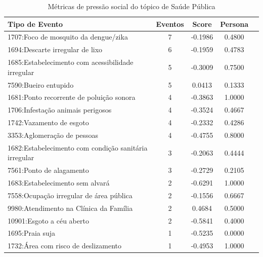 \begin{table}[htbp]
	\centering
	\caption{Métricas de pressão social do tópico de Saúde Pública}
	\label{tab:eventos_populares_public_health}
	\begin{tabular}{|l|c|c|c|c|}
		\hline
		\textbf{Tipo de Evento}                               & \textbf{Eventos} & \textbf{Score} & \textbf{Persona} \\
		\hline
		1707:Foco de mosquito da dengue/zika                  & 7                & -0.1986        & 0.4800           \\
		\hline
		1694:Descarte irregular de lixo                       & 6                & -0.1959        & 0.4783           \\
		\hline
		1685:Estabelecimento com acessibilidade irregular     & 5                & -0.3009        & 0.7500           \\
		\hline
		7590:Bueiro entupido                                  & 5                & 0.0413         & 0.1333           \\
		\hline
		1681:Ponto recorrente de poluição sonora              & 4                & -0.3863        & 1.0000           \\
		\hline
		1706:Infestação animais perigosos                     & 4                & -0.3524        & 0.4667           \\
		\hline
		1742:Vazamento de esgoto                              & 4                & -0.2332        & 0.4286           \\
		\hline
		3353:Aglomeração de pessoas                           & 4                & -0.4755        & 0.8000           \\
		\hline
		1682:Estabelecimento com condição sanitária irregular & 3                & -0.2063        & 0.4444           \\
		\hline
		7561:Ponto de alagamento                              & 3                & -0.2729        & 0.2105           \\
		\hline
		1683:Estabelecimento sem alvará                       & 2                & -0.6291        & 1.0000           \\
		\hline
		7558:Ocupação irregular de área pública               & 2                & -0.1556        & 0.6667           \\
		\hline
		9980:Atendimento na Clínica da Família                & 2                & 0.4684         & 0.5000           \\
		\hline
		10901:Esgoto a céu aberto                             & 2                & -0.5841        & 0.4000           \\
		\hline
		1695:Praia suja                                       & 1                & -0.5235        & 0.0000           \\
		\hline
		1732:Área com risco de deslizamento                   & 1                & -0.4953        & 1.0000           \\
		\hline
	\end{tabular}
\end{table}

